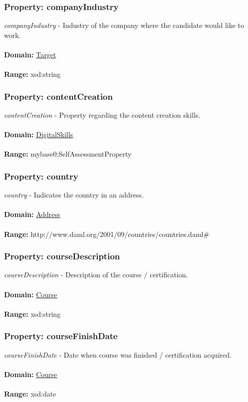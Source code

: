 \documentclass[a4paper,12pt]{article}
\numberwithin{equation}{section}
\begin{document}
\subsubsection{Property: companyIndustry}\hypertarget{companyIndustry}{}
\textit{companyIndustry} - Industry of the company where the candidate would like to work.
\\\\
\textbf{Domain:} \hyperlink{Target}{Target} 
\\\\
\textbf{Range:}  xsd:string

\subsubsection{Property: contentCreation}\hypertarget{contentCreation}{}
\textit{contentCreation} - Property regarding the content creation skills.
\\\\
\textbf{Domain:} \hyperlink{DigitalSkills}{DigitalSkills} 
\\\\
\textbf{Range:}  mybase0:SelfAssessmentProperty

\subsubsection{Property: country}\hypertarget{country}{}
\textit{country} - Indicates the country in an address.
\\\\
\textbf{Domain:} \hyperlink{Address}{Address} 
\\\\
\textbf{Range:}  http://www.daml.org/2001/09/countries/countries.daml\#

\subsubsection{Property: courseDescription}\hypertarget{courseDescription}{}
\textit{courseDescription} - Description of the course / certification.
\\\\
\textbf{Domain:} \hyperlink{Course}{Course} 
\\\\
\textbf{Range:}  xsd:string

\subsubsection{Property: courseFinishDate}\hypertarget{courseFinishDate}{}
\textit{courseFinishDate} - Date when course was finished / certification acquired.
\\\\
\textbf{Domain:} \hyperlink{Course}{Course} 
\\\\
\textbf{Range:}  xsd:date
\end{document}
